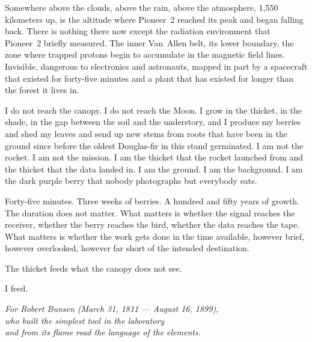 \documentclass[12pt, letterpaper]{article}
\begin{document}
Somewhere above the clouds, above the rain, above the atmosphere, 1,550 kilometers up, is the altitude where Pioneer~2 reached its peak and began falling back. There is nothing there now except the radiation environment that Pioneer~2 briefly measured. The inner Van~Allen belt, its lower boundary, the zone where trapped protons begin to accumulate in the magnetic field lines. Invisible, dangerous to electronics and astronauts, mapped in part by a spacecraft that existed for forty-five minutes and a plant that has existed for longer than the forest it lives in.

I do not reach the canopy. I do not reach the Moon. I grow in the thicket, in the shade, in the gap between the soil and the understory, and I produce my berries and shed my leaves and send up new stems from roots that have been in the ground since before the oldest Douglas-fir in this stand germinated. I am not the rocket. I am not the mission. I am the thicket that the rocket launched from and the thicket that the data landed in. I am the ground. I am the background. I am the dark purple berry that nobody photographs but everybody eats.

Forty-five minutes. Three weeks of berries. A hundred and fifty years of growth. The duration does not matter. What matters is whether the signal reaches the receiver, whether the berry reaches the bird, whether the data reaches the tape. What matters is whether the work gets done in the time available, however brief, however overlooked, however far short of the intended destination.

The thicket feeds what the canopy does not see.

I feed.

\vspace{2em}
\begin{center}
\textit{For Robert Bunsen (March 31, 1811 --- August 16, 1899),\\who built the simplest tool in the laboratory\\and from its flame read the language of the elements.}
\end{center}
\end{document}
